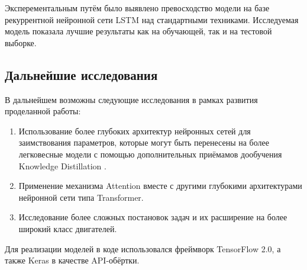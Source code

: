\documentclass[14pt]{extarticle}
\begin{document}
Эксперементальным путём было выявлено превосходство модели на базе рекуррентной нейронной сети LSTM над стандартными техниками. Исследуемая модель показала лучшие результаты как на обучающей, так и на тестовой выборке. 

\subsection{Дальнейшие исследования}

В дальнейшем возможны следующие исследования в рамках развития проделанной работы:

\begin{enumerate}
\item Использование более глубоких архитектур нейронных сетей  для заимствования параметров, которые могут быть перенесены на более легковесные модели с помощью дополнительных приёмамов дообучения Knowledge Distillation \cite{44873}.

\item Применение механизма Attention вместе с другими глубокими архитектурами нейронной сети типа Transformer.

\item Исследование более сложных постановок задач и их расширение на более широкий класс двигателей.

\end{enumerate}

Для реализации моделей в коде использовался фреймворк TensorFlow 2.0, а также Keras в качестве API-обёртки.



\newpage
{}


\nocite{*}
\end{document}

